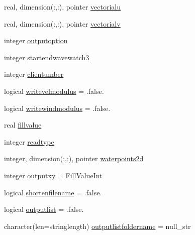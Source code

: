 \begin{DoxyCompactItemize}
\item 
real, dimension(\+:,\+:), pointer \mbox{\hyperlink{structmodulehdf5toasciiandbin_1_1t__hdf5toasciiandbin_a584cbf69c8a90e8afbcfe1523b835a4e}{vectorialu}}
\item 
real, dimension(\+:,\+:), pointer \mbox{\hyperlink{structmodulehdf5toasciiandbin_1_1t__hdf5toasciiandbin_a59d7b45763fcb10deee2723e26fdd975}{vectorialv}}
\item 
integer \mbox{\hyperlink{structmodulehdf5toasciiandbin_1_1t__hdf5toasciiandbin_a75be8404a8c651e072c8b4edf544c84d}{outputoption}}
\item 
integer \mbox{\hyperlink{structmodulehdf5toasciiandbin_1_1t__hdf5toasciiandbin_ad6ed4851350c2b3ff09992d74a1f5372}{startendwavewatch3}}
\item 
integer \mbox{\hyperlink{structmodulehdf5toasciiandbin_1_1t__hdf5toasciiandbin_a63a183155e1ad14bb3d7e4755e2d82c7}{clientumber}}
\item 
logical \mbox{\hyperlink{structmodulehdf5toasciiandbin_1_1t__hdf5toasciiandbin_a4e20630ebf11ef73ff65fb8fede0c78d}{writevelmodulus}} = .false.
\item 
logical \mbox{\hyperlink{structmodulehdf5toasciiandbin_1_1t__hdf5toasciiandbin_ae56e5a3c09adfb93ef9a3a720be4c326}{writewindmodulus}} = .false.
\item 
real \mbox{\hyperlink{structmodulehdf5toasciiandbin_1_1t__hdf5toasciiandbin_a3c58cd2412a2188c10cdff620de984dc}{fillvalue}}
\item 
integer \mbox{\hyperlink{structmodulehdf5toasciiandbin_1_1t__hdf5toasciiandbin_a2d2c667415493a43951e4f3ff79439ee}{readtype}}
\item 
integer, dimension(\+:,\+:), pointer \mbox{\hyperlink{structmodulehdf5toasciiandbin_1_1t__hdf5toasciiandbin_a3e8b64deb0d34b79eed8243c573afe65}{waterpoints2d}}
\item 
integer \mbox{\hyperlink{structmodulehdf5toasciiandbin_1_1t__hdf5toasciiandbin_a6be535732f2e59b9b20119572291e6f2}{outputxy}} = Fill\+Value\+Int
\item 
logical \mbox{\hyperlink{structmodulehdf5toasciiandbin_1_1t__hdf5toasciiandbin_a99c62449e81ccf1e000ad990eca69b3c}{shortenfilename}} = .false.
\item 
logical \mbox{\hyperlink{structmodulehdf5toasciiandbin_1_1t__hdf5toasciiandbin_a06798a3fde4a3d93b1b7e000953edf8f}{outputlist}} = .false.
\item 
character(len=stringlength) \mbox{\hyperlink{structmodulehdf5toasciiandbin_1_1t__hdf5toasciiandbin_aea05c49eea812d73301dbd4a78663ad5}{outputlistfoldername}} = null\+\_\+str

\end{DoxyCompactItemize}

